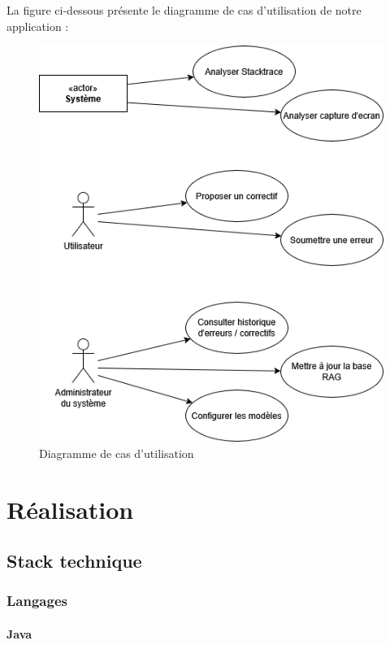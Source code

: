\documentclass[12pt,a4paper]{report}
\begin{document}
	La figure ci-dessous présente le diagramme de cas d'utilisation de notre application :
	
	\begin{figure}[H]
		\centering
		\includegraphics{use-case.drawio.png}
		\caption{Diagramme de cas d'utilisation}
		\label{fig:use-case}
	\end{figure}	
	
	\chapter{Réalisation}

	\section{Stack technique}
	
	\subsection{Langages}
	
	\subsubsection{Java}
	
\end{document}
